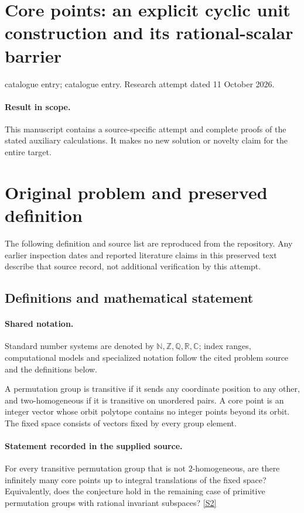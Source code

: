 \documentclass[11pt]{article}
\begin{document}
\section*{Core points: an explicit cyclic unit construction and its rational-scalar barrier}
\noindent catalogue entry; catalogue entry. Research attempt dated 11 October 2026.
\paragraph{Result in scope.}This manuscript contains a source-specific attempt and complete proofs of the stated auxiliary calculations. It makes no new solution or novelty claim for the entire target.
\section{Original problem and preserved definition}
The following definition and source list are reproduced from the repository. Any earlier inspection dates and reported literature claims in this preserved text describe that source record, not additional verification by this attempt.
\subsection{Definitions and mathematical statement}

\paragraph{Shared notation.}Standard number systems are denoted by $\mathbb N,\mathbb Z,\mathbb Q,\mathbb R,\mathbb C$; index ranges, computational models and specialized notation follow the cited problem source and the definitions below.


A permutation group is transitive if it sends any coordinate position to any other, and two-homogeneous if it is transitive on unordered pairs. A core point is an integer vector whose orbit polytope contains no integer points beyond its orbit. The fixed space consists of vectors fixed by every group element.
\paragraph{Statement recorded in the supplied source.}
For every transitive permutation group that is not $2$-homogeneous, are there infinitely many core points up to integral translations of the fixed space? Equivalently, does the conjecture hold in the remaining case of primitive permutation groups with rational invariant subspaces? \href{https://doi.org/10.4171/owr/2015/46}{[S2]}
\end{document}
